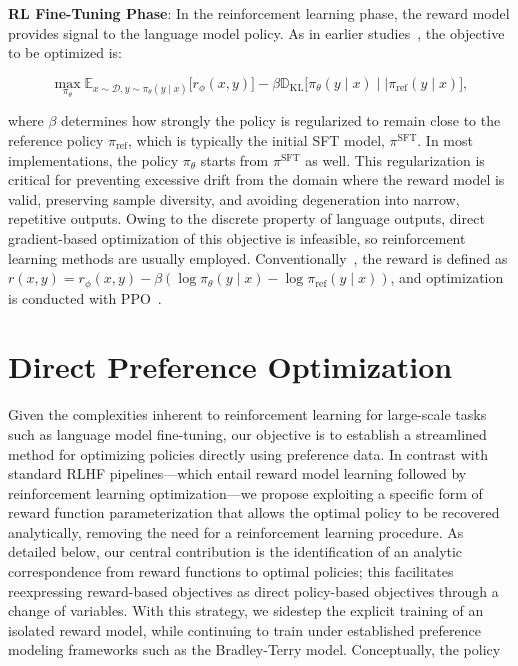 \textbf{RL Fine-Tuning Phase}: In the reinforcement learning phase, the reward model provides signal to the language model policy. As in earlier studies~\citep{jaques2017sequence, jaques2020human}, the objective to be optimized is:

\begin{equation}\label{eq:RL}
\max_{\pi_{\theta}}  \mathbb{E}_{x\sim \mathcal{D}, y\sim \pi_{\theta}(y \mid x)}\bigl[r_{\phi}(x, y)\bigr] - \beta\mathbb{D}_{\textrm{KL}}\bigl[\pi_{\theta}(y\mid x)\mid \mid \pi_\text{ref}(y\mid x)\bigr],
\end{equation}

where $\beta$ determines how strongly the policy is regularized to remain close to the reference policy $\pi_\text{ref}$, which is typically the initial SFT model, $\pi^\text{SFT}$. 
In most implementations, the policy $\pi_\theta$ starts from $\pi^\text{SFT}$ as well. This regularization is critical for preventing excessive drift from the domain where the reward model is valid, preserving sample diversity, and avoiding degeneration into narrow, repetitive outputs. Owing to the discrete property of language outputs, direct gradient-based optimization of this objective is infeasible, so reinforcement learning methods are usually employed. Conventionally~\citep{ziegler2020finetuning, stiennon2022learning, bai2022training, ouyang2022training}, the reward is defined as ${r(x, y) = r_{\phi}(x, y) -\beta (\log \pi_{\theta}(y\mid x) - \log \pi_\text{ref}(y\mid x))}$, and optimization is conducted with PPO~\cite{schulman2017proximal}. 

\section{Direct Preference Optimization}\label{sec:DPO}

Given the complexities inherent to reinforcement learning for large-scale tasks such as language model fine-tuning, our objective is to establish a streamlined method for optimizing policies directly using preference data. In contrast with standard RLHF pipelines—which entail reward model learning followed by reinforcement learning optimization—we propose exploiting a specific form of reward function parameterization that allows the optimal policy to be recovered analytically, removing the need for a reinforcement learning procedure. As detailed below, our central contribution is the identification of an analytic correspondence from reward functions to optimal policies; this facilitates reexpressing reward-based objectives as direct policy-based objectives through a change of variables. With this strategy, we sidestep the explicit training of an isolated reward model, while continuing to train under established preference modeling frameworks such as the Bradley-Terry model. Conceptually, the policy

